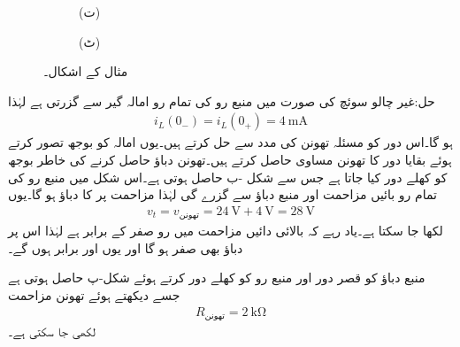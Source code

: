 \begin{figure}
\begin{subfigure}{0.5\textwidth}
\begin{tikzpicture}
\end{tikzpicture}%
\caption*{(ت)}
\end{subfigure}%
\begin{subfigure}{0.5\textwidth}
\centering
\pgfplotsset{scaled y ticks=false, scaled x ticks=false}
%
\caption*{(ٹ)}
\end{subfigure}%
\caption{مثال  کے اشکال۔}
\label{شکل_عارضی_دو_عدد_مزاحمت_امالہ_گیر_الف}
\end{figure}

حل:غیر چالو سوئچ کی صورت میں منبع رو کی تمام رو امالہ گیر سے گزرتی ہے لہٰذا
\begin{align*}
i_L(0_-)=i_L(0_+)=\SI{4}{\milli\ampere}
\end{align*}
ہو گا۔اس دور کو مسئلہ تھونن کی مدد سے حل کرتے ہیں۔یوں امالہ کو بوجھ تصور کرتے ہوئے بقایا دور کا تھونن مساوی حاصل کرتے ہیں۔تھونن دباؤ حاصل کرنے کی خاطر بوجھ کو کھلے دور کیا جاتا ہے جس سے شکل -ب حاصل ہوتی ہے۔اس شکل میں منبع رو کی تمام رو بائیں مزاحمت اور منبع دباؤ سے گزرے گی لہٰذا مزاحمت پر  کا دباؤ ہو گا۔یوں
\begin{align*}
v_t=v_{\text{تھونن}}=\SI{24}{\volt}+\SI{4}{\volt}=\SI{28}{\volt}
\end{align*}
لکھا جا سکتا ہے۔یاد رہے کہ بالائی دائیں مزاحمت میں رو صفر کے برابر ہے لہٰذا اس پر دباؤ بھی صفر ہو گا اور یوں  اور  برابر ہوں گے۔

منبع دباؤ کو قصر دور اور منبع رو کو کھلے دور کرتے ہوئے شکل-پ حاصل ہوتی ہے جسے دیکھتے ہوئے تھونن مزاحمت
\begin{align*}
R_{\text{تھونن}}=\SI{2}{\kilo\ohm}
\end{align*}
لکھی جا سکتی ہے۔

